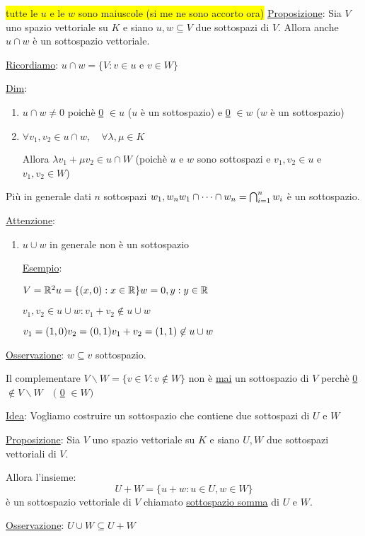 \documentclass{article}
\newcommand{\hl}[1]{\colorbox{yellow}{#1}}
\newcommand{\ul}[1]{\underline{#1}}
\newcommand{\R}{\mathbb{R}}
\begin{document}
\hl{tutte le $u$ e le $w$ sono maiuscole (si me ne sono accorto ora)}
\ul{Proposizione}: Sia $V$ uno spazio vettoriale su $K$ e siano $u,w\subseteq V$ due sottospazi di $V$. Allora anche $u\cap w$ è un sottospazio vettoriale.

\ul{Ricordiamo}: $u\cap w=\{V:v\in u$ e $v\in W\}$

\ul{Dim}:
\begin{enumerate}
	\item $u\cap w\not=0$ poichè \ul{0} $\in u$ ($u$ è un sottospazio) e \ul{0} $\in w$ ($w$ è un sottospazio)
	\item $\forall v_1,v_2\in u\cap w,\quad\forall\lambda,\mu\in K$

	  Allora $\lambda v_1+\mu v_2\in u\cap W$ (poichè $u$ e $w$ sono sottospazi e $v_1,v_2\in u$ e $v_1,v_2\in W$)
\end{enumerate}

Più in generale dati $n$ sottospazi $w_1,w_n\\w_1\cap\cdots\cap w_n=\bigcap^n_{i=1}w_i$ è un sottospazio.

\ul{Attenzione}:
\begin{enumerate}
	\item $u\cup w$ in generale non è un sottospazio

	  \ul{Esempio}:

	  $V=\R^2\\u=\{(x,0):x\in\R\}\\w={0,y}:y\in\R$

	  $v_1,v_2\in u\cup w:v_1+v_2\not\in u\cup w$

	  $v_1=(1,0)\\v_2=(0,1)\\v_1+v_2=(1,1)\not\in u\cup w$
\end{enumerate}

\ul{Osservazione}: $w\subseteq v$ sottospazio.

Il complementare $V\backslash W=\{v\in V:v\not\in W\}$ non è \ul{mai} un sottospazio di $V$ perchè \ul{0} $\not\in V\backslash W\quad($ \ul{0} $\in W)$

\ul{Idea}: Vogliamo costruire un sottospazio che contiene due sottospazi di $U$ e $W$

\ul{Proposizione}: Sia $V$ uno spazio vettoriale su $K$ e siano $U,W$ due sottospazi vettoriali di $V$.

Allora l'insieme:
$$U+W=\{u+w:u\in U,w\in W\}$$
è un sottospazio vettoriale di $V$ chiamato \ul{sottospazio somma} di $U$ e $W$.

\ul{Osservazione}: $U\cup W\subseteq U+W$
\end{document}
